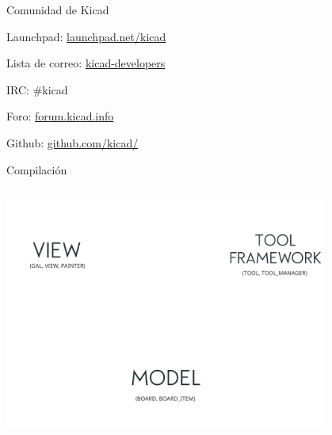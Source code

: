 

\begin{frame}{Comunidad de Kicad}
	\begin{center}
	\begin{minipage}{0.7\textwidth}
	\begin{fullpageitemize}
		\item[\faCode] Launchpad: \href{https://launchpad.net/kicad}{launchpad.net/kicad} \\
		\pause
		\item[\faEnvelope] Lista de correo: \href{http://lists.launchpad.net/kicad-developers}{kicad-developers} \\
		\pause
		\item[\faHashtag] IRC: \#kicad \\
		\pause
		\item[\faUsers] Foro: \href{https://forum.kicad.info/}{forum.kicad.info} \\
		\pause
		\item[\faGithub] Github: \href{https://github.com/kicad/}{github.com/kicad/}
	\end{fullpageitemize}
	\end{minipage}
	\end{center}
\end{frame} 


\begin{frame}{Compilación}
	\inputminted[fontsize=\large]{bash}{code/get-kicad.sh}
\end{frame}



\begin{frame}
	\centering
	\includegraphics[width=0.8\textwidth]{gfx/tool_framework.png}
\end{frame}


